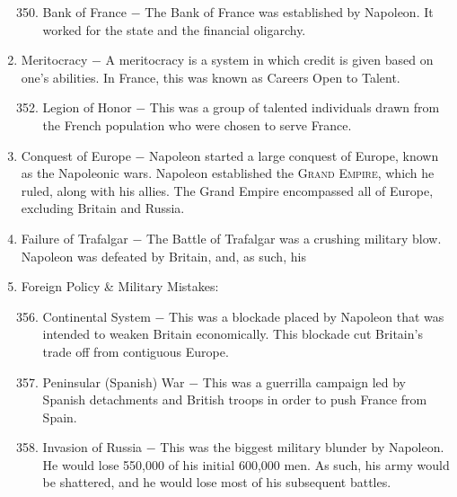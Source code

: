 \documentclass[12pt]{article}
\begin{document}
\begin{enumerate}
\begin{enumerate}[label=\arabic{*}.]
\setcounter{enumii}{349}

\item Bank of France $-$ The Bank of France was established by Napoleon. It worked for the state and the financial oligarchy.

\end{enumerate}
\setcounter{enumi}{350}

\item Meritocracy $-$ A meritocracy is a system in which credit is given based on one's abilities. In France, this was known as Careers Open to Talent.

\begin{enumerate}[label=\arabic{*}.]
\setcounter{enumii}{351}

\item Legion of Honor $-$ This was a group of talented individuals drawn from the French population who were chosen to serve France.

\end{enumerate}
\setcounter{enumi}{352}

\item Conquest of Europe $-$ Napoleon started a large conquest of Europe, known as the Napoleonic wars. Napoleon established the \textsc{Grand Empire}, which he ruled, along with his allies. The Grand Empire encompassed all of Europe, excluding Britain and Russia. 

\item Failure of Trafalgar $-$ The Battle of Trafalgar was a crushing military blow. Napoleon was defeated by Britain, and, as such, his 

\item Foreign Policy \& Military Mistakes:

\begin{enumerate}[label=\arabic{*}.]
\setcounter{enumii}{355}

\item Continental System $-$ This was a blockade placed by Napoleon that was intended to weaken Britain economically. This blockade cut Britain's trade off from contiguous Europe.

\item Peninsular (Spanish) War $-$ This was a guerrilla campaign led by Spanish detachments and British troops in order to push France from Spain.

\item Invasion of Russia $-$ This was the biggest military blunder by Napoleon. He would lose 550,000 of his initial 600,000 men. As such, his army would be shattered, and he would lose most of his subsequent battles.


\end{enumerate}
\end{enumerate}
\end{document}
